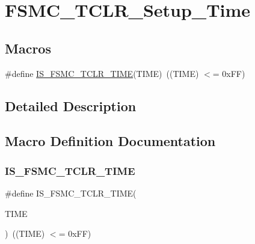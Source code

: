 \hypertarget{group___f_s_m_c___t_c_l_r___setup___time}{}\section{F\+S\+M\+C\+\_\+\+T\+C\+L\+R\+\_\+\+Setup\+\_\+\+Time}
\label{group___f_s_m_c___t_c_l_r___setup___time}
\subsection*{Macros}
\begin{DoxyCompactItemize}
\item 
\#define \mbox{\hyperlink{group___f_s_m_c___t_c_l_r___setup___time_ga324848d0d9c0d2aad7ab70873b4a15e9}{I\+S\+\_\+\+F\+S\+M\+C\+\_\+\+T\+C\+L\+R\+\_\+\+T\+I\+ME}}(T\+I\+ME)~((T\+I\+ME) $<$= 0x\+F\+F)
\end{DoxyCompactItemize}


\subsection{Detailed Description}


\subsection{Macro Definition Documentation}
\mbox{\label{group___f_s_m_c___t_c_l_r___setup___time_ga324848d0d9c0d2aad7ab70873b4a15e9}} 
\subsubsection{\texorpdfstring{IS\_FSMC\_TCLR\_TIME}{IS\_FSMC\_TCLR\_TIME}}
{\footnotesize\ttfamily \#define I\+S\+\_\+\+F\+S\+M\+C\+\_\+\+T\+C\+L\+R\+\_\+\+T\+I\+ME(\begin{DoxyParamCaption}\item[{}]{T\+I\+ME }\end{DoxyParamCaption})~((T\+I\+ME) $<$= 0x\+F\+F)}

